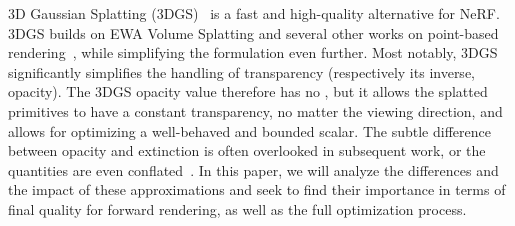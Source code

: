 3D Gaussian Splatting (3DGS)~\cite{kerbl3Dgaussians} is a fast and high-quality alternative for NeRF.
3DGS builds on EWA Volume Splatting and several other works on point-based rendering~\cite{lassner2021pulsar,wiles2020synsin,zhang2022differentiable,kopanas2021point, Yifan:DSS:2019}, while simplifying the formulation even further.
Most notably, 3DGS significantly simplifies the handling of transparency (respectively its inverse, opacity). 
The 3DGS opacity value therefore has no , but it allows the splatted primitives to have a constant transparency, no matter the viewing direction, and allows for optimizing a well-behaved and bounded scalar.
The subtle difference between opacity and extinction is often overlooked in subsequent work, or the quantities are even conflated~\cite{guedon2023sugar,bolanos2024gaussian,lee2024gscore,huang2023photo}.
In this paper, we will analyze the differences and the impact of these approximations and seek to find their importance in terms of final quality for forward rendering, as well as the full optimization process.

